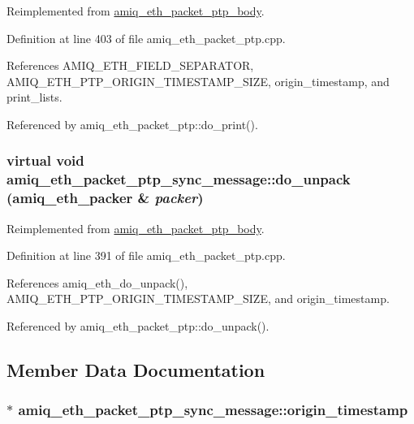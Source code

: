 Reimplemented from \hyperlink{classamiq__eth__packet__ptp__body_a44ff8df4c84f236f8bab792ceb338e6a}{amiq\_\-eth\_\-packet\_\-ptp\_\-body}.

Definition at line 403 of file amiq\_\-eth\_\-packet\_\-ptp.cpp.

References AMIQ\_\-ETH\_\-FIELD\_\-SEPARATOR, AMIQ\_\-ETH\_\-PTP\_\-ORIGIN\_\-TIMESTAMP\_\-SIZE, origin\_\-timestamp, and print\_\-lists.

Referenced by amiq\_\-eth\_\-packet\_\-ptp::do\_\-print().\hypertarget{classamiq__eth__packet__ptp__sync__message_ad0756fb94c7d9ea5ea0da34ca6b41a53}{
\subsubsection[{do\_\-unpack}]{\setlength{\rightskip}{0pt plus 5cm}virtual void amiq\_\-eth\_\-packet\_\-ptp\_\-sync\_\-message::do\_\-unpack ({\bf amiq\_\-eth\_\-packer} \& {\em packer})}}
\label{classamiq__eth__packet__ptp__sync__message_ad0756fb94c7d9ea5ea0da34ca6b41a53}


Reimplemented from \hyperlink{classamiq__eth__packet__ptp__body_a17a10ad537b6553f35b54d2f037d4f0d}{amiq\_\-eth\_\-packet\_\-ptp\_\-body}.

Definition at line 391 of file amiq\_\-eth\_\-packet\_\-ptp.cpp.

References amiq\_\-eth\_\-do\_\-unpack(), AMIQ\_\-ETH\_\-PTP\_\-ORIGIN\_\-TIMESTAMP\_\-SIZE, and origin\_\-timestamp.

Referenced by amiq\_\-eth\_\-packet\_\-ptp::do\_\-unpack().

\subsection{Member Data Documentation}
\hypertarget{classamiq__eth__packet__ptp__sync__message_a33121ee506581632ab544ead48cbe342}{
\subsubsection[{origin\_\-timestamp}]{$\ast$ {\bf amiq\_\-eth\_\-packet\_\-ptp\_\-sync\_\-message::origin\_\-timestamp}}}
\label{classamiq__eth__packet__ptp__sync__message_a33121ee506581632ab544ead48cbe342}


